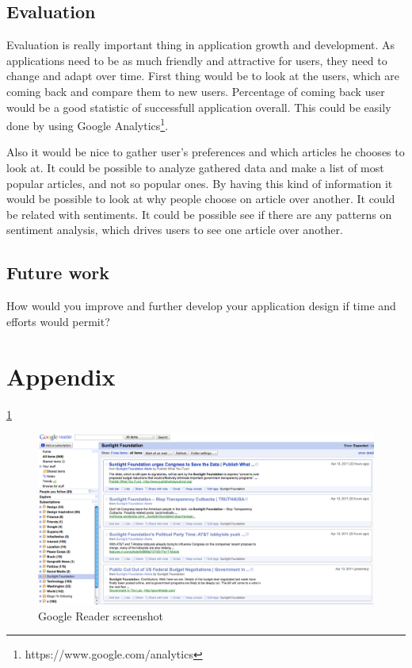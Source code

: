 \documentclass{acm_proc_10ptArticle-sp}
\begin{document}
\subsection{Evaluation}

Evaluation is really important thing in application growth and development. As applications need to be as much friendly and attractive for users, they need to change and adapt over time. First thing would be to look at the users, which are coming back and compare them to new users. Percentage of coming back user would be a good statistic of successfull application overall. This could be easily done by using Google Analytics\footnote{https://www.google.com/analytics}.

Also it would be nice to gather user's preferences and which articles he chooses to look at. It could be possible to analyze gathered data and make a list of most popular articles, and not so popular ones. By having this kind of information it would be possible to look at why people choose on article over another. It could be related with sentiments. It could be possible see if there are any patterns on sentiment analysis, which drives users to see one article over another.

\subsection{Future work}

How would you improve and further develop your application design if time  and efforts would permit?








\newpage

\onecolumn
\section{Appendix}

\ref{screenshot:reader}
\begin{figure}[H]
  \centering
  \includegraphics[width=0.9\linewidth]{img/Google-Reader.png}
  \caption{Google Reader screenshot}
  \label{screenshot:reader}
\end{figure}
\end{document}
